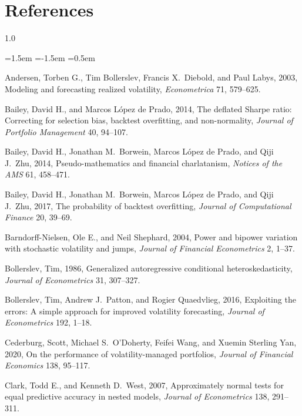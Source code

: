 \documentclass[12pt,a4paper]{article}
\begin{document}
\section*{References}
\begin{spacing}{1.0}
\begin{list}{}{\leftmargin=1.5em \itemindent=-1.5em \itemsep=0.5em}

\item Andersen, Torben G., Tim Bollerslev, Francis X.\ Diebold, and Paul Labys, 2003, Modeling and
forecasting realized volatility, \emph{Econometrica} 71, 579--625.

\item Bailey, David H., and Marcos L\'opez de Prado, 2014, The deflated Sharpe ratio: Correcting for
selection bias, backtest overfitting, and non-normality, \emph{Journal of Portfolio Management} 40,
94--107.

\item Bailey, David H., Jonathan M.\ Borwein, Marcos L\'opez de Prado, and Qiji J.\ Zhu, 2014,
Pseudo-mathematics and financial charlatanism, \emph{Notices of the AMS} 61, 458--471.

\item Bailey, David H., Jonathan M.\ Borwein, Marcos L\'opez de Prado, and Qiji J.\ Zhu, 2017, The
probability of backtest overfitting, \emph{Journal of Computational Finance} 20, 39--69.

\item Barndorff-Nielsen, Ole E., and Neil Shephard, 2004, Power and bipower variation with stochastic
volatility and jumps, \emph{Journal of Financial Econometrics} 2, 1--37.

\item Bollerslev, Tim, 1986, Generalized autoregressive conditional heteroskedasticity, \emph{Journal
of Econometrics} 31, 307--327.

\item Bollerslev, Tim, Andrew J.\ Patton, and Rogier Quaedvlieg, 2016, Exploiting the errors: A simple
approach for improved volatility forecasting, \emph{Journal of Econometrics} 192, 1--18.

\item Cederburg, Scott, Michael S.\ O'Doherty, Feifei Wang, and Xuemin Sterling Yan, 2020, On the
performance of volatility-managed portfolios, \emph{Journal of Financial Economics} 138, 95--117.

\item Clark, Todd E., and Kenneth D.\ West, 2007, Approximately normal tests for equal predictive
accuracy in nested models, \emph{Journal of Econometrics} 138, 291--311.


\end{list}
\end{spacing}
\end{document}
